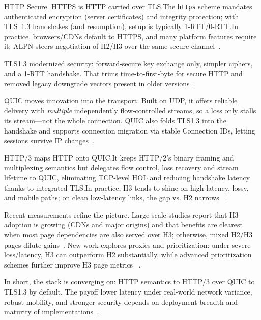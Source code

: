 HTTP Secure. HTTPS is HTTP carried over TLS.\@ The \texttt{https} scheme
mandates authenticated encryption (server certificates) and integrity
protection; with TLS~1.3 handshakes (and resumption), setup is typically
1-RTT/0-RTT.\@ In practice, browsers/CDNs default to HTTPS, and many platform
features require it; ALPN steers negotiation of H2/H3 over the same secure
channel~\cite{rfc8446,rfc9110}.

TLS1.3 modernized security: forward-secure key exchange only, simpler ciphers,
and a 1-RTT handshake. That trims time-to-first-byte for secure HTTP and
removed legacy downgrade vectors present in older versions~\cite{rfc8446}.

QUIC moves innovation into the transport. Built on UDP, it offers reliable
delivery with \emph{multiple} independently flow-controlled streams, so a loss
only stalls its stream—not the whole connection. QUIC also folds TLS1.3 into
the handshake and supports connection migration via stable Connection IDs,
letting sessions survive IP changes~\cite{rfc9000}.

HTTP/3 maps HTTP onto QUIC.\@ It keeps HTTP/2's binary framing and multiplexing
semantics but delegates flow control, loss recovery and stream lifetime to
QUIC, eliminating TCP-level HOL and reducing handshake latency thanks to
integrated TLS.\@ In practice, H3 tends to shine on high-latency, lossy, and
mobile paths; on clean low-latency links, the gap vs. H2 narrows
~\cite{rfc9114,perna2022,trevisan2021}.

Recent measurements refine the picture. Large-scale studies report that H3
adoption is growing (CDNs and major origins) and that benefits are clearest
when most page dependencies are also served over H3; otherwise, mixed H2/H3
pages dilute gains~\cite{perna2022,trevisan2021}. New work explores proxies and
prioritization: under severe loss/latency, H3 can outperform H2 substantially,
while advanced prioritization schemes further improve H3 page metrics
~\cite{liu2024,gupta2024}.

In short, the stack is converging on: HTTP semantics to HTTP/3 over QUIC to
TLS1.3 by default. The payoff lower latency under real-world network variance,
robust mobility, and stronger security depends on deployment breadth and
maturity of implementations~\cite{rfc9114,rfc9000,rfc8446}.